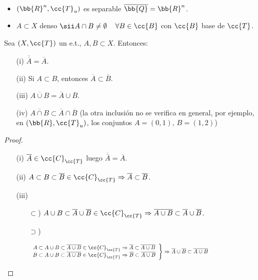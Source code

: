 \begin{ejemplo}\
    \begin{itemize}
        \item $(\bb{R}^n, \cc{T}_u)$ es separable $\overline{\bb{Q}}=\bb{R}^n$.
        \item $A\subset X$ denso $\sii A\cap B\neq \emptyset$\ \ $\forall B \in \cc{B}$ con $\cc{B}$ base de $\cc{T}$.
    \end{itemize}
    \endsquare
\end{ejemplo}

\begin{prop}
    Sea $(X, \cc{T})$ un e.t., $A,B\subset X$. Entonces:
    \begin{enumerate}
        \item[(i)] $\overline{\overline{A}} = \overline{A}$.
        \item[(ii)] Si $A\subset B$, entonces $\overline{A}\subset \overline{B}$.
        \item[(iii)] $\overline{A\cup B} = \overline{A}\cup \overline{B}$.
        \item[(iv)] $\overline{A\cap B} \subset \overline{A}\cap \overline{B}$ (la otra inclusión no se verifica en general, por ejemplo, en $(\bb{R}, \cc{T}_u)$, los conjuntos $A=(0,1)$, $B=(1,2)$) 
    \end{enumerate}

    \begin{proof}\
        \begin{enumerate}
            \item[(i)] $\overline{A}\in \cc{C}_{\cc{T}}$ luego $\overline{\overline{A}} = \overline{A}$.
            \item[(ii)] $A\subset B \subset \overline{B}\in \cc{C}_{\cc{T}}\Rightarrow \overline{A}\subset \overline{B}$.
            \item[(iii)] 
            \begin{itemize}
                \item[$\subset$)] $A\cup B \subset \overline{A}\cup \overline{B}\in \cc{C}_{\cc{T}}\Rightarrow \overline{A\cup B}\subset \overline{A}\cup \overline{B}$.
                \item[$\supset$)]\ \\
                \vspace{-2cm}
                
                \begin{gather*}
                    \left.
                    \begin{array}{c}
                        A\subset A\cup B \subset \overline{A\cup B}\in \cc{C}_{\cc{T}} \Rightarrow \overline{A}\subset\overline{A\cup B} \\
                        B\subset A\cup B \subset \overline{A\cup B}\in \cc{C}_{\cc{T}} \Rightarrow \overline{B}\subset\overline{A\cup B}
                    \end{array}\right\} \Rightarrow \overline{A}\cup \overline{B}\subset \overline{A\cup B} \hspace*{5cm}
                \end{gather*}


\end{itemize}
\end{enumerate}
\end{proof}
\end{prop}

